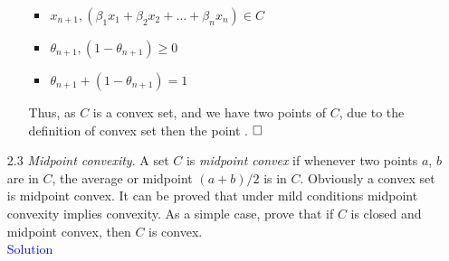 \documentclass[12pt, oneside]{article}%
\begin{document}
\begin{enumerate}[font=\bfseries]
\begin{itemize}
    \begin{itemize}
        \item $x_{n+1},(\beta_1x_1+\beta_2x_2+\dots+\beta_nx_n)\in C$
        \item $\theta_{n+1}, (1-\theta_{n+1})\geq0$
        \item $\theta_{n+1} + (1-\theta_{n+1})=1$
    \end{itemize} 
    Thus, as $C$ is a convex set, and we have two points of $C$, due to the definition of convex set then the point .\newline
    \hspace*{0pt}\hfill $\hfill\square$
\end{itemize}

\newpage

\item [2.3] \textit{Midpoint convexity}. A set $C$ is \textit{midpoint convex} if whenever two points $a$, $b$ are in $C$, the average or midpoint $(a + b)/2$ is in $C$. Obviously a convex set is midpoint convex. It can be proved that under mild conditions midpoint convexity implies convexity. As a simple case, prove that if $C$ is closed and midpoint convex, then $C$ is convex.\\

\Large\textsf{\textcolor{blue}{Solution}}
\normalsize\\


\end{enumerate}
\end{document}
